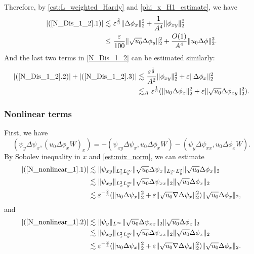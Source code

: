 \documentclass[reqno, 11pt]{amsart}
\theoremstyle{plain}
\theoremstyle{definition}
\theoremstyle{remark}
\numberwithin{equation}{section}
\begin{document}
Therefore, by \eqref{est:L_weighted_Hardy} and \eqref{phi_x_H1_estimate}, we have
\begin{equation}\label{N_Dis_1_3}
\begin{aligned}
|(\ref{N_Dis_1_2}.1)| \lesssim &~ \varepsilon^{\frac{2}{3}} \|\Delta \phi_x\|_2^2 + \frac{1}{A^4} \| \phi_{xy}\|_2^2\\
\le&~ \frac{\varepsilon}{100} \|\sqrt{u_0} \Delta \phi_y\|_2^2 +  \frac{O(1)}{A^4} \|u_0 \Delta \phi\|_2^2.
\end{aligned}
\end{equation}
And the last two terms in \eqref{N_Dis_1_2} can be estimated similarly:
\begin{equation}\label{N_Dis_1_4}
\begin{aligned}
|(\ref{N_Dis_1_2}.2)| + |(\ref{N_Dis_1_2}.3)| \lesssim &~ \frac{\varepsilon^{\frac{1}{3}}}{A^2}\|\phi_{xy}\|_2^2 + \varepsilon \| \Delta \phi_x \|_2^2\\
\lesssim&_A ~  \varepsilon^{\frac{1}{3}} (\|u_0 \Delta \phi_x\|_2^2  +  \varepsilon \| \sqrt{u_0} \Delta \phi_{xy} \|_2^2).
\end{aligned}
\end{equation}

\subsubsection{Nonlinear terms}
First, we have
\begin{equation}\label{N_nonlinear_1}
(\psi_y \Delta \psi_x, (u_0 \Delta\phi_x W)_x) = - (\psi_{xy} \Delta \psi_x, u_0 \Delta\phi_x W) - (\psi_{y} \Delta \psi_{xx}, u_0 \Delta\phi_x W).
\end{equation}
By Sobolev inequality in $x$ and \eqref{est:mix_norm}, we can estimate
\begin{equation}\label{N_nonlinear_1_1}
\begin{aligned}
|(\ref{N_nonlinear_1}.1)| &\lesssim \| \psi_{xy}\|_{L^2_x L^\infty_y} \| \sqrt{u_0} \Delta \psi_x \|_{L^\infty_x L^2_y} \| \sqrt{u_0} \Delta \phi_x\|_2\\
&\lesssim \| \psi_{xy}\|_{L^2_x L^\infty_y} \| \sqrt{u_0} \Delta \psi_{xx} \|_{2} \| \sqrt{u_0} \Delta \phi_x\|_2\\
&\lesssim \varepsilon^{-\frac{2}{3}} (\|u_0 \Delta \psi_x\|_2^2  +  \varepsilon \| \sqrt{u_0} \nabla \Delta \psi_{x} \|_2^2) \| \sqrt{u_0} \Delta \phi_x\|_2,
\end{aligned}
\end{equation}
and
\begin{equation}\label{N_nonlinear_1_2}
\begin{aligned}
|(\ref{N_nonlinear_1}.2)| &\lesssim \| \psi_{y}\|_{L^\infty} \| \sqrt{u_0} \Delta \psi_{xx} \|_{2} \| \sqrt{u_0} \Delta \phi_x\|_2\\
&\lesssim \| \psi_{xy}\|_{L^2_x L^\infty_y} \| \sqrt{u_0} \Delta \psi_{xx} \|_{2} \| \sqrt{u_0} \Delta \phi_x\|_2\\
&\lesssim \varepsilon^{-\frac{2}{3}} (\|u_0 \Delta \psi_x\|_2^2  +  \varepsilon \| \sqrt{u_0} \nabla \Delta \psi_{x} \|_2^2) \| \sqrt{u_0} \Delta \phi_x\|_2.
\end{aligned}
\end{equation}
\end{document}
